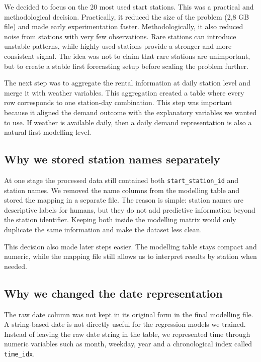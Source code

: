 \documentclass[conference]{IEEEtran}
\begin{document}
We decided to focus on the 20 most used start stations. This was a practical and methodological decision. 
Practically, it reduced the size of the problem (2,8 GB file) and made early experimentation faster. Methodologically, 
it also reduced noise from stations with very few observations. Rare stations can introduce unstable 
patterns, while highly used stations provide a stronger and more consistent signal. The idea was not 
to claim that rare stations are unimportant, but to create a stable first forecasting setup before 
scaling the problem further.

The next step was to aggregate the rental information at daily station level and merge it with weather 
variables. This aggregation created a table where every row corresponds to one station-day combination. 
This step was important because it aligned the demand outcome with the explanatory variables we wanted 
to use. If weather is available daily, then a daily demand representation is also a natural first 
modelling level.

\subsection{Why we stored station names separately}
At one stage the processed data still contained both \texttt{start\_station\_id} and station names. 
We removed the name columns from the modelling table and stored the mapping in a separate file. The 
reason is simple: station names are descriptive labels for humans, but they do not add predictive 
information beyond the station identifier. Keeping both inside the modelling matrix would only duplicate 
the same information and make the dataset less clean.

This decision also made later steps easier. The modelling table stays compact and numeric, while the 
mapping file still allows us to interpret results by station when needed.

\subsection{Why we changed the date representation}
The raw date column was not kept in its original form in the final modelling file. A string-based date 
is not directly useful for the regression models we trained. Instead of leaving the raw date string in 
the table, we represented time through numeric variables such as month, weekday, year 
and a chronological index called \texttt{time\_idx}.
\end{document}
